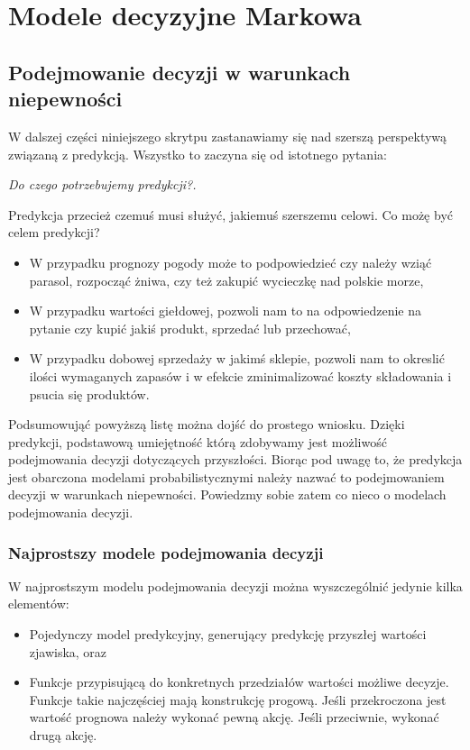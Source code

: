 \documentclass[10pt,a4paper]{book}
\begin{document}
\chapter{Modele decyzyjne Markowa}

\section{Podejmowanie decyzji w warunkach niepewności}

W dalszej części niniejszego skrytpu zastanawiamy się nad szerszą perspektywą związaną z predykcją. Wszystko to zaczyna się od istotnego pytania:

\textit{Do czego potrzebujemy predykcji?.}

Predykcja przecież czemuś musi służyć, jakiemuś szerszemu celowi.
Co możę być celem predykcji?

\begin{itemize}
\item W przypadku prognozy pogody może to podpowiedzieć czy należy wziąć parasol, rozpocząć żniwa, czy też zakupić wycieczkę nad polskie morze,
\item W przypadku wartości giełdowej, pozwoli nam to na odpowiedzenie na pytanie czy kupić jakiś produkt, sprzedać lub przechować,
\item W przypadku dobowej sprzedaży w jakimś sklepie, pozwoli nam to okreslić ilości wymaganych zapasów i w efekcie zminimalizować koszty składowania i psucia się produktów. 
\end{itemize}

Podsumowująć powyższą listę można dojść do prostego wniosku. Dzięki predykcji, podstawową umiejętność którą zdobywamy jest możliwość podejmowania decyzji dotyczących przyszłości. Biorąc pod uwagę to, że predykcja jest obarczona modelami probabilistycznymi należy nazwać to podejmowaniem decyzji w warunkach niepewności. Powiedzmy sobie zatem co nieco o modelach podejmowania decyzji.

\subsection{Najprostszy modele podejmowania decyzji}

W najprostszym modelu podejmowania decyzji można wyszczególnić jedynie kilka elementów:
\begin{itemize}
\item Pojedynczy model predykcyjny, generujący predykcję przyszłej wartości zjawiska, oraz
\item Funkcje przypisującą do konkretnych przedziałów wartości możliwe decyzje. Funkcje takie najczęściej mają konstrukcję progową. Jeśli przekroczona jest wartość prognowa należy wykonać pewną akcję. Jeśli przeciwnie, wykonać drugą akcję. 
\end{itemize}
\end{document}
